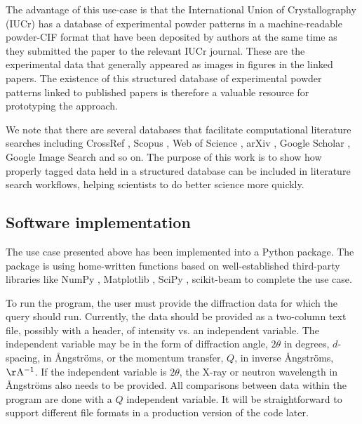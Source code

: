 \documentclass[preprint]{iucr}
\begin{document}
The advantage of this use-case is that the International Union of Crystallography (IUCr) has a database of experimental powder patterns in a machine-readable powder-CIF format \cite{hallInternationalTablesCrystallography2006} that have been deposited by authors at the same time as they submitted the paper to the relevant IUCr journal.   These are the experimental data that generally appeared as images in figures in the linked papers.  The existence of this structured database of experimental powder patterns linked to published papers is therefore a valuable resource for prototyping the approach. 

We note that there are several databases that facilitate computational literature searches including CrossRef \cite{crossrefRESTAPI2020}, Scopus \cite{mongeonJournalCoverageWeb2016,burnhamScopusDatabaseReview2006}, Web of Science \cite{mongeonJournalCoverageWeb2016,mikkiGoogleScholarCompared2009}, arXiv \cite{ginspargArXiv202011}, Google Scholar \cite{mikkiGoogleScholarCompared2009, samadzadehComparisonFourSearch2013}, Google Image Search \cite{fergusLearningObjectCategories2005} and so on.  The purpose of this work is to show how properly tagged data held in a structured database can be included in literature search workflows, helping scientists to do better science more quickly.


\subsection{Software implementation}

The use case presented above has been implemented into a Python package. The package is using home-written functions based on well-established third-party libraries like NumPy \cite{harrisArrayProgrammingNumPy2020}, Matplotlib \cite{hunterMatplotlib2DGraphics2007a}, SciPy \cite{virtanenSciPyFundamentalAlgorithms2020b}, scikit-beam \cite{scikit-beamScikitbeam2022} to complete the use case.

To run the program, the user must provide the diffraction data for which the query should run. Currently, the data should be provided as a two-column  text file, possibly with a header, of intensity vs. an independent variable. The independent variable may be in the form of diffraction angle, $2\theta$ in degrees, $d$-spacing, in Ångströms, or the momentum transfer, $Q$, in inverse Ångströms, $\mathrm{\AA^{-1}}$. If the independent variable is $2\theta$,  the X-ray or neutron wavelength in Ångströms also needs to be provided.  All comparisons between data within the program are done with a $Q$ independent variable.  It will be straightforward to support different file formats in a production version of the code later.
\end{document}
